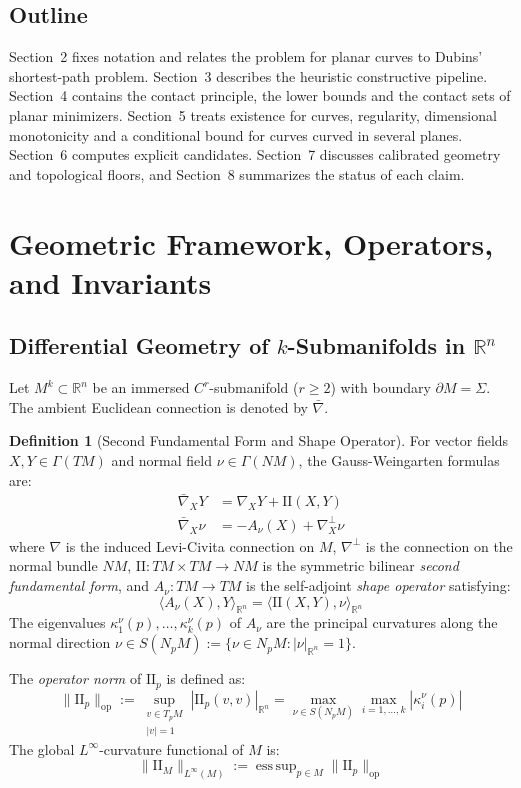 \documentclass[11pt,reqno]{amsart}
\theoremstyle{definition}
\newtheorem{definition}[theorem]{Definition}
\providecommand{\R}{\mathbb{R}}
\providecommand{\II}{\mathrm{I\!I}}
\newcommand{\op}{\mathrm{op}}
\numberwithin{equation}{section}
\providecommand{\II}{\mathrm{II}}
\providecommand{\R}{\mathbb{R}}
\begin{document}
\subsection{Outline}
Section~2 fixes notation and relates the problem for planar curves to Dubins' shortest-path problem. Section~3 describes the heuristic constructive pipeline. Section~4 contains the contact principle, the lower bounds and the contact sets of planar minimizers. Section~5 treats existence for curves, regularity, dimensional monotonicity and a conditional bound for curves curved in several planes. Section~6 computes explicit candidates. Section~7 discusses calibrated geometry and topological floors, and Section~8 summarizes the status of each claim.

\section{Geometric Framework, Operators, and Invariants}

\subsection{Differential Geometry of \texorpdfstring{$k$}{k}-Submanifolds in \texorpdfstring{$\R^n$}{R\textasciicircum n}}
Let $M^k \subset \R^n$ be an immersed $C^r$-submanifold ($r \ge 2$) with boundary $\partial M = \Sigma$. The ambient Euclidean connection is denoted by $\bar{\nabla}$.

\begin{definition}[Second Fundamental Form and Shape Operator]
For vector fields $X, Y \in \Gamma(TM)$ and normal field $\nu \in \Gamma(NM)$, the Gauss-Weingarten formulas are:
\begin{align}
\bar{\nabla}_X Y &= \nabla_X Y + \II(X, Y) \\
\bar{\nabla}_X \nu &= -A_\nu(X) + \nabla^\perp_X \nu
\end{align}
where $\nabla$ is the induced Levi-Civita connection on $M$, $\nabla^\perp$ is the connection on the normal bundle $NM$, $\II: TM \times TM \to NM$ is the symmetric bilinear \emph{second fundamental form}, and $A_\nu: TM \to TM$ is the self-adjoint \emph{shape operator} satisfying:
\begin{equation}
\langle A_\nu(X), Y \rangle_{\R^n} = \langle \II(X, Y), \nu \rangle_{\R^n}
\end{equation}
The eigenvalues $\kappa_1^\nu(p), \dots, \kappa_k^\nu(p)$ of $A_\nu$ are the principal curvatures along the normal direction $\nu \in S(N_pM) := \{\nu \in N_pM : |\nu|_{\R^n} = 1\}$.

The \emph{operator norm} of $\II_p$ is defined as:
\begin{equation}
\|\II_p\|_{\op} := \sup_{\substack{v \in T_pM \\ |v|=1}} |\II_p(v,v)|_{\R^n} = \max_{\nu \in S(N_pM)} \max_{i=1,\dots,k} |\kappa_i^\nu(p)|
\end{equation}
The global $L^\infty$-curvature functional of $M$ is:
\begin{equation}
\|\II_M\|_{L^\infty(M)} := \operatorname{ess\,sup}_{p \in M} \|\II_p\|_{\op}
\end{equation}
\end{definition}
\end{document}
